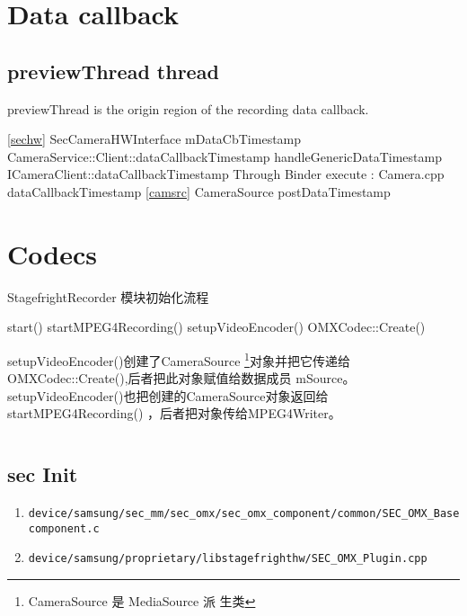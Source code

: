 \documentclass[a4paper,10pt,twoside]{article}%
\begin{document}
\section{Data callback}
\subsection{previewThread thread}
previewThread is the origin region of the recording data callback.
\begin{flushleft}
\ref{sechw} SecCameraHWInterface mDataCbTimestamp 
\invoke{10pt} CameraService::Client::dataCallbackTimestamp
\invoke{20pt} handleGenericDataTimestamp
\invoke{30pt} ICameraClient::dataCallbackTimestamp
\invoke{40pt} Through Binder execute : Camera.cpp dataCallbackTimestamp
\invoke{50pt} \ref{camsrc} CameraSource postDataTimestamp
\end{flushleft}

\section{Codecs}
\index{}
\newcommand{\setupVideoEncoder}{setupVideoEncoder()}
\newcommand{\startRecording}{startMPEG4Recording()}
\newcommand{\codeccreate}{ OMXCodec::Create()}
StagefrightRecorder 模块初始化流程
\begin{flushleft}
    start() \invoke{10pt} \startRecording \invoke{20pt} \setupVideoEncoder
    \invoke{30pt}
\codeccreate
\end{flushleft}
  \setupVideoEncoder 创建了CameraSource \footnote{CameraSource 是 MediaSource 派
  生类}对象并把它传递给\codeccreate,后者把此对象赋值给数据成员
  mSource。\setupVideoEncoder 也把创建的CameraSource对象返回给\startRecording
  ，后者把对象传给MPEG4Writer。
  
 \begin{lstlisting}[language=C] 
\end{lstlisting}



\subsection{sec Init}
    \begin{enumerate} 
\setlength{\parskip}{-1pt}
\item \verb|device/samsung/sec_mm/sec_omx/sec_omx_component/common/SEC_OMX_Basecomponent.c|
\item \verb|device/samsung/proprietary/libstagefrighthw/SEC_OMX_Plugin.cpp|
\end{enumerate}
\end{document}
